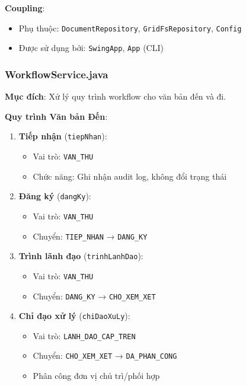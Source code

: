 \documentclass[12pt,a4paper]{article}
\begin{document}
\textbf{Coupling}:
\begin{itemize}
    \item Phụ thuộc: \texttt{DocumentRepository}, \texttt{GridFsRepository}, \texttt{Config}
    \item Được sử dụng bởi: \texttt{SwingApp}, \texttt{App} (CLI)
\end{itemize}

\subsubsection{WorkflowService.java}
\textbf{Mục đích}: Xử lý quy trình workflow cho văn bản đến và đi.

\textbf{Quy trình Văn bản Đến}:

\begin{enumerate}
    \item \textbf{Tiếp nhận} (\texttt{tiepNhan}):
    \begin{itemize}
        \item Vai trò: \texttt{VAN\_THU}
        \item Chức năng: Ghi nhận audit log, không đổi trạng thái
    \end{itemize}
    
    \item \textbf{Đăng ký} (\texttt{dangKy}):
    \begin{itemize}
        \item Vai trò: \texttt{VAN\_THU}
        \item Chuyển: \texttt{TIEP\_NHAN} → \texttt{DANG\_KY}
    \end{itemize}
    
    \item \textbf{Trình lãnh đạo} (\texttt{trinhLanhDao}):
    \begin{itemize}
        \item Vai trò: \texttt{VAN\_THU}
        \item Chuyển: \texttt{DANG\_KY} → \texttt{CHO\_XEM\_XET}
    \end{itemize}
    
    \item \textbf{Chỉ đạo xử lý} (\texttt{chiDaoXuLy}):
    \begin{itemize}
        \item Vai trò: \texttt{LANH\_DAO\_CAP\_TREN}
        \item Chuyển: \texttt{CHO\_XEM\_XET} → \texttt{DA\_PHAN\_CONG}
        \item Phân công đơn vị chủ trì/phối hợp
    \end{itemize}
    

\end{enumerate}
\end{document}
